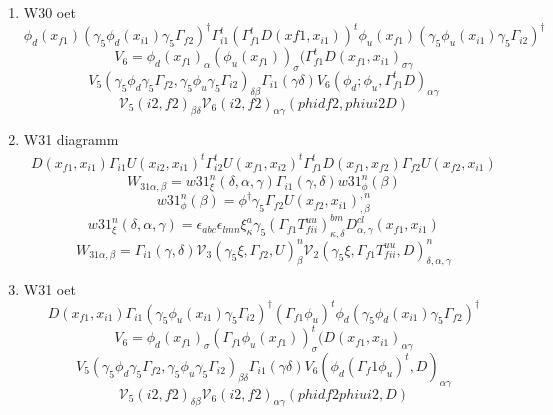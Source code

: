 \documentclass{article}[12pt]
\begin{document}
\begin{itemize}
\begin{enumerate}
$$$$
\item W30 oet
$$
\phi_d(x_{f1})(\gamma_5\phi_d(x_{i1})\gamma_5\Gamma_{f2})^\dagger
\Gamma_{i1}^t(\Gamma_{f1}^tD(x{f1},x_{i1}))^t\phi_u(x_{f1})(\gamma_5\phi_u(x_{i1})\gamma_5\Gamma_{i2})^\dagger 
$$
$$
V_6=\phi_d(x_{f1})_{\alpha}(\phi_u(x_{f1}))_{\sigma}(\Gamma_{f1}^tD(x_{f1},x_{i1})_{\sigma\gamma}
$$
$$
V_5(\gamma_5\phi_d\gamma_5\Gamma_{f2},\gamma_5\phi_u\gamma_5\Gamma_{i2})_{\delta\beta}\Gamma_{i1}(\gamma\delta)V_6(\phi_d;\phi_u,\Gamma_{f1}^tD)_{\alpha\gamma}
$$
$$
{\mathcal V}_5(i2,f2)_{\beta\delta}{\mathcal V}_6(i2,f2)_{\alpha\gamma}(phidf2,phiui2D)
$$

\item W31 diagramm
\begin{eqnarray}
D(x_{f1},x_{i1})\Gamma_{i1}U(x_{i2},x_{i1})^t\Gamma_{i2}^tU(x_{f1},x_{i2})^t\Gamma_{f1}^tD(x_{f1},x_{f2})\Gamma_{f2}U(x_{f2},x_{i1})
\end{eqnarray}
$$
W_{31\alpha,\beta}=w31_{\xi}^{n}\left(\delta,\alpha,\gamma\right)\Gamma_{i1}\left(\gamma,\delta\right)w31_{\phi}^{n}\left(\beta\right)
$$
$$
w31_{\phi}^{n}\left(\beta\right)=\phi^{\dagger}\gamma_5\Gamma_{f2}U\left(x_{f2},x_{i1}\right)^{,n}_{,\beta}
$$
$$
w31_{\xi}^{n}\left(\delta,\alpha,\gamma\right)=\epsilon_{abc}\epsilon_{lmn}\xi^{a}_{\kappa}\gamma_5\left(\Gamma_{f1}T_{fii}^{uu}\right)^{bm}_{\kappa,\delta}D^{cl}_{\alpha,\gamma}\left(x_{f1},x_{i1}\right)
$$
$$
W_{31\alpha,\beta}=\Gamma_{i1}\left(\gamma,\delta\right){\mathcal V}_{3}\left(\gamma_5\xi,\Gamma_{f2},U\right)^{n}_{\beta}{\mathcal V}_{2}\left(\gamma_5\xi,\Gamma_{f1}T_{fii}^{uu},D\right)^{n}_{\delta,\alpha,\gamma}
$$
\item W31 oet
$$
D(x_{f1},x_{i1})\Gamma_{i1}(\gamma_5\phi_u(x_{i1})\gamma_5\Gamma_{i2})^\dagger
(\Gamma_{f1}\phi_u)^t\phi_d(\gamma_5\phi_d(x_{i1})\gamma_5\Gamma_{f2})^\dagger 
$$
$$
V_6=\phi_d(x_{f1})_{\sigma}(\Gamma_{f1}\phi_u(x_{f1}))^t_{\sigma}(D(x_{f1},x_{i1})_{\alpha\gamma}
$$
$$
V_5(\gamma_5\phi_d\gamma_5\Gamma_{f2},\gamma_5\phi_u\gamma_5\Gamma_{i2})_{\beta\delta}\Gamma_{i1}(\gamma\delta)V_6(\phi_d(\Gamma_f1\phi_u)^t,D)_{\alpha\gamma}
$$
$$
{\mathcal V}_5(i2,f2)_{\delta\beta}{\mathcal V}_6(i2,f2)_{\alpha\gamma}(phidf2phiui2,D)
$$



\end{enumerate}
\end{itemize}
\end{document}
